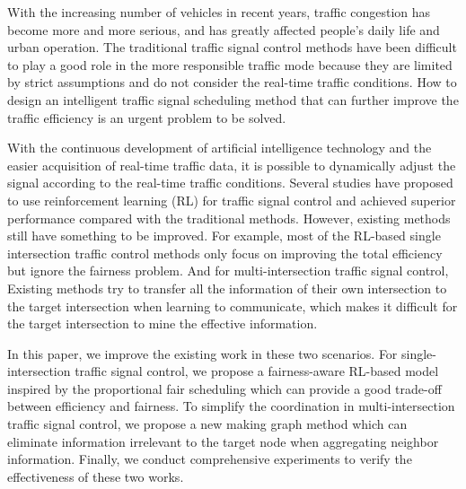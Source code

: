 \begin{abstractEn}
With the increasing number of vehicles in recent years, traffic congestion has become more and more serious, and has greatly affected people's daily life and urban operation. The traditional traffic signal control methods have been difficult to play a good role in the more responsible traffic mode because they are limited by strict assumptions and do not consider the real-time traffic conditions. How to design an intelligent traffic signal scheduling method that can further improve the traffic efficiency is an urgent problem to be solved.

With the continuous development of artificial intelligence technology and the easier acquisition of real-time traffic data, it is possible to dynamically adjust the signal according to the real-time traffic conditions. Several studies have proposed to use reinforcement learning (RL) for traffic signal
control and achieved superior performance compared with the traditional methods. However, existing methods still have something to be improved. For example, most of the RL-based single intersection traffic control methods only focus on improving
the total efficiency but ignore the fairness problem. And for multi-intersection traffic signal control, Existing methods try to transfer all the information of their own intersection to the target intersection when learning to communicate, 
which makes it difficult for the target intersection to mine the effective information.

In this paper, we improve the existing work in these two scenarios. For single-intersection traffic signal control, we propose a fairness-aware RL-based model inspired by the proportional fair scheduling which can provide a good trade-off between
efficiency and fairness. To simplify the coordination in multi-intersection traffic signal control, we propose a new making graph method which can eliminate information irrelevant to the target node when aggregating neighbor information.
Finally, we conduct comprehensive experiments to verify the effectiveness of these two works.
\end{abstractEn}



\usepackage{subfig}
\usepackage{rotating}
\usepackage[usenames,dvipsnames]{xcolor}
\usepackage{tikz}
\usepackage{pgfplots}
\pgfplotsset{compat=1.16}
\usepackage{ifthen}
\usepackage{longtable}
\usepackage{siunitx}
\usepackage{listings}
\usepackage{multirow}
\usepackage[bottom]{footmisc}
\usepackage{pifont}

